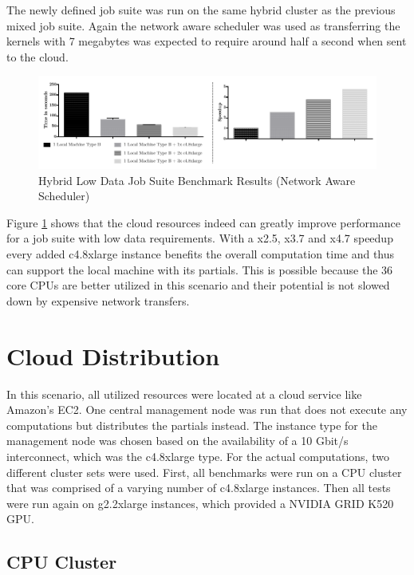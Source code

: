 The newly defined job suite was run on the same hybrid cluster as the previous mixed job suite. Again the network aware scheduler was used as transferring the kernels with 7 megabytes was expected to require around half a second when sent to the cloud.

\begin{figure}[!htb]
	\includegraphics[width=1.0\textwidth]{images/hybrid_lowdata_benchmark.pdf}
	\centering
	\caption{Hybrid Low Data Job Suite Benchmark Results (Network Aware Scheduler)}
	\label{img:hybrid_low_data_benchmark_results_network_aware}
\end{figure}

Figure \ref{img:hybrid_low_data_benchmark_results_network_aware} shows that the cloud resources indeed can greatly improve performance for a job suite with low data requirements. With a x2.5, x3.7 and x4.7 speedup every added c4.8xlarge instance benefits the overall computation time and thus can support the local machine with its partials. This is possible because the 36 core CPUs are better utilized in this scenario and their potential is not slowed down by expensive network transfers.

\section{Cloud Distribution}

In this scenario, all utilized resources were located at a cloud service like Amazon's EC2. One central management node was run that does not execute any computations but distributes the partials instead. The instance type for the management node was chosen based on the availability of a 10 Gbit/s interconnect, which was the c4.8xlarge type. For the actual computations, two different cluster sets were used. First, all benchmarks were run on a CPU cluster that was comprised of a varying number of c4.8xlarge instances. Then all tests were run again on g2.2xlarge instances, which provided a NVIDIA GRID K520 GPU.

\subsection{CPU Cluster}
